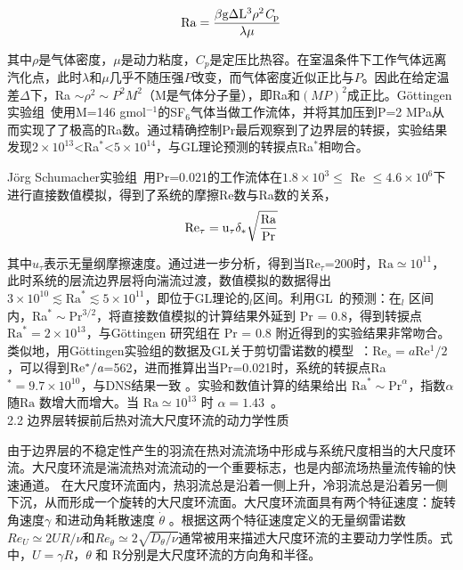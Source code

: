 \documentclass[10pt,aps]{article}
\def\be{\begin{equation}}
\def\ee{\end{equation}}
\def\Ra{\textrm{Ra}}
\def\Pr{\textrm{Pr}}
\begin{document}
{\be
\rm Ra=\frac{\beta g\Delta L^3 \rho^2 \emph C_p}{\lambda\mu}
\ee
\vskip 6pt

其中$\rho$是气体密度，$\mu$是动力粘度，$C_p$是定压比热容。在室温条件下工作气体远离汽化点，此时$\lambda$和$\mu$几乎不随压强$P$改变，而气体密度近似正比与$P$。因此在给定温差$\Delta$下，Ra $\sim\rho^2\sim P^2 M^2$（M是气体分子量），即Ra和$(MP)^2$成正比。Göttingen实验组~\cite{HFBA12}使用M=146 gmol$^{-1}$的SF$_6$气体当做工作流体，并将其加压到P=2 MPa从而实现了了极高的Ra数。通过精确控制Pr最后观察到了边界层的转捩，实验结果发现$2\times10^{13}$<Ra$^*$<$5 \times 10^{14}$，与GL理论预测的转捩点Ra$^*$相吻合。
\vskip 6pt

Jörg Schumacher实验组~\cite{SBPS16}用Pr=0.021的工作流体在$1.8 \times 10^3 \leq$ Re $\leq 4.6\times 10^6$下进行直接数值模拟，得到了系统的摩擦Re数与Ra数的关系，
\be
\rm Re_\tau=u_\tau\delta_*\sqrt{\frac{Ra}{Pr}}
\ee
\vskip 6pt

其中$u_\tau$表示无量纲摩擦速度。通过进一步分析，得到当Re$_\tau$=200时，$\Ra \simeq 10^{11}$，此时系统的层流边界层将向湍流过渡，数值模拟的数据得出$3\times 10^{10}\lesssim \Ra^* \lesssim 5\times 10^{11}$，即位于GL理论的\uppercase\expandafter{}$_l$区间。利用GL~\cite{GL00}的预测：在\uppercase\expandafter{}$_l$ 区间内，Ra$^* \sim $Pr$^{3/2}$，将直接数值模拟的计算结果外延到 Pr = 0.8，得到转捩点$\Ra^* = 2 \times 10^{13}$，与Göttingen 研究组在 Pr = 0.8 附近得到的实验结果非常吻合。类似地，用Göttingen实验组的数据及GL关于剪切雷诺数的模型~\cite{GL02}：Re$_s=a$Re$^1/2$，可以得到$\rm{Re^*}/{\emph a}$=562，进而推算出当Pr=0.021时，系统的转捩点Ra$^*=9.7\times10^{10}$，与DNS结果一致 。实验和数值计算的结果给出 $\Ra^* \sim \Pr^\alpha$，指数$\alpha$ 随$\Ra$ 数增大而增大。当 $\Ra \simeq 10^{13}$ 时 $\alpha = 1.43$~\cite{ABH17}。\\



2.2 边界层转捩前后热对流大尺度环流的动力学性质 

由于边界层的不稳定性产生的羽流在热对流流场中形成与系统尺度相当的大尺度环流。大尺度环流是湍流热对流流动的一个重要标志，也是内部流场热量流传输的快速通道。 在大尺度环流面内，热羽流总是沿着一侧上升，冷羽流总是沿着另一侧下沉，从而形成一个旋转的大尺度环流面。大尺度环流面具有两个特征速度：旋转角速度$\gamma$ \cite{QT01a}和进动角耗散速度 $\dot{\theta}$ \cite{BA06a}。根据这两个特征速度定义的无量纲雷诺数$Re_U \simeq 2UR/\nu$和$Re_{\dot{\theta}} \simeq 2\sqrt{D_\theta/\nu}$通常被用来描述大尺度环流的主要动力学性质。式中，$U = \gamma R$，${\theta}$ 和 R分别是大尺度环流的方向角和半径。
\vskip 6pt


}
\end{document}
